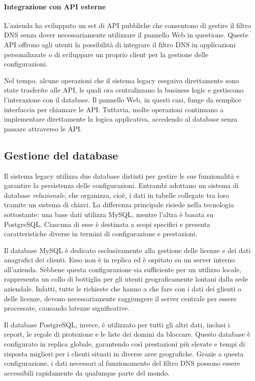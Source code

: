 \paragraph{Integrazione con API esterne}
L'azienda ha sviluppato un set di API pubbliche che consentono di gestire il filtro DNS senza dover necessariamente utilizzare il pannello Web in questione. Queste API offrono agli utenti la possibilità di integrare il filtro DNS in applicazioni personalizzate o di sviluppare un proprio client per la gestione delle configurazioni.

Nel tempo, alcune operazioni che il sistema legacy eseguiva direttamente sono state trasferite alle API, le quali ora centralizzano la business logic e gestiscono l'interazione con il database. Il pannello Web, in questi casi, funge da semplice interfaccia per chiamare le API. Tuttavia, molte operazioni continuano a implementare direttamente la logica applicativa, accedendo al database senza passare attraverso le API.

\subsection{Gestione del database}
Il sistema legacy utilizza due database distinti per gestire le sue funzionalità e garantire la persistenza delle configurazioni. Entrambi adottano un sistema di database \emph{relazionale}, che organizza, cioè, i dati in tabelle collegate tra loro tramite un sistema di chiavi. La differenza principale risiede nella tecnologia sottostante: una base dati utilizza MySQL, mentre l’altra è basata su PostgreSQL. Ciascuna di esse è destinata a scopi specifici e presenta caratteristiche diverse in termini di configurazione e prestazioni.

Il database MySQL è dedicato esclusivamente alla gestione delle licenze e dei dati anagrafici dei clienti. Esso non è in replica ed è ospitato su un server interno all’azienda. Sebbene questa configurazione sia sufficiente per un utilizzo locale, rappresenta un collo di bottiglia per gli utenti geograficamente lontani dalla sede aziendale. Infatti, tutte le richieste che hanno a che fare con i dati dei glienti o delle licenze, devono necessariamente raggiungere il server centrale per essere processate, causando latenze significative.

Il database PostgreSQL, invece, è utilizzato per tutti gli altri dati, inclusi i report, le regole di protezione e le liste dei domini da bloccare. Questo database è configurato in replica globale, garantendo così prestazioni più elevate e tempi di risposta migliori per i clienti situati in diverse aree geografiche. Grazie a questa configurazione, i dati necessari al funzionamento del filtro DNS possono essere accessibili rapidamente da qualunque parte del mondo.


